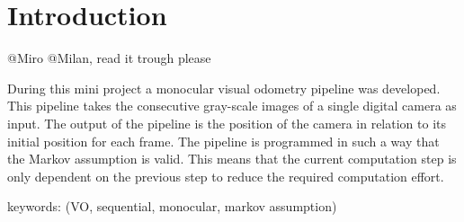 \section{Introduction}
@Miro @Milan, read it trough please

During this mini project a monocular visual odometry pipeline was developed. This pipeline takes the consecutive gray-scale images of a single digital camera as input. 
The output of the pipeline is the position of the camera in relation to its initial position for each frame.
The pipeline is programmed in such a way that the Markov assumption is valid. This means that the current computation step is only dependent on the previous step to reduce the required computation effort.

keywords:
(\textcolor[rgb]{0.2,0.8,0.2}{VO}, sequential,\textcolor[rgb]{0.2,0.8,0.2}{ monocular, markov assumption})